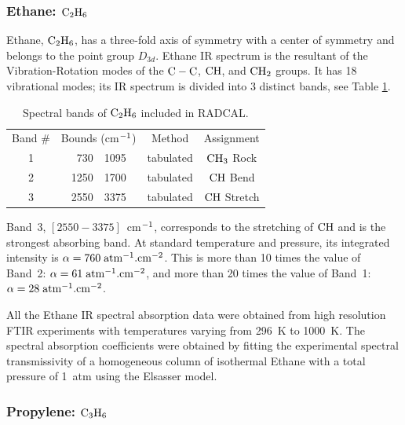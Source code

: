 \subsubsection{Ethane: $\rm C_2H_6$}

  Ethane, $\rm C_2H_6$, has a three-fold axis of symmetry with a center of symmetry
  and belongs to the point group $D_{3d}$. Ethane IR spectrum
  is the resultant of the Vibration-Rotation modes of
  the $\rm C-C$, $\rm CH$, and $\rm CH_2$ groups.
  It has 18 vibrational modes; its IR spectrum is divided into 3
  distinct bands, see Table \ref{Table::C2H6}. 
   \begin{table} [h p]
    \centering
    \caption{Spectral bands of $\rm C_2H_6$ included in RADCAL.}
    \vspace{0.1in}
    \label{Table::C2H6}
    \begin{tabular}{|c|r@{-}l|c|c|} 
      \hline
      Band \# & \multicolumn{2}{|l|}{Bounds (cm$\rm ^{-1}$) } & Method & Assignment \\
      \cline{1-5}  
      1 & 730  & 1095 & tabulated &  $\rm CH_3$ Rock\\
      2 & 1250 & 1700 & tabulated &  $\rm CH$  Bend\\
      3 & 2550 & 3375 & tabulated &  $\rm CH$  Stretch\\
      \hline
    \end{tabular} 
  \end{table}
  Band~3, $\left[2550-3375\right]$~cm$\rm ^{-1}$, corresponds to the 
  stretching of $\rm CH$ and is the strongest absorbing band. At standard temperature
  and pressure, its integrated intensity is $\alpha = 760\;\rm {atm^{-1}.cm^{-2}}$.
  This is more than 10 times the value of Band~2: $\alpha = 61\;\rm {atm^{-1}.cm^{-2}}$, and 
  more than 20 times the value of Band~1: $\alpha = 28\;\rm {atm^{-1}.cm^{-2}}$.
  
  All the Ethane IR spectral absorption data were obtained from high resolution
  FTIR experiments with temperatures varying from 296~K to 1000~K.
  The spectral absorption coefficients were obtained by fitting the experimental
  spectral transmissivity of a homogeneous column of isothermal Ethane
  with a total pressure of 1~atm using the Elsasser model. 

\subsubsection{Propylene: $\rm C_3H_6$}


